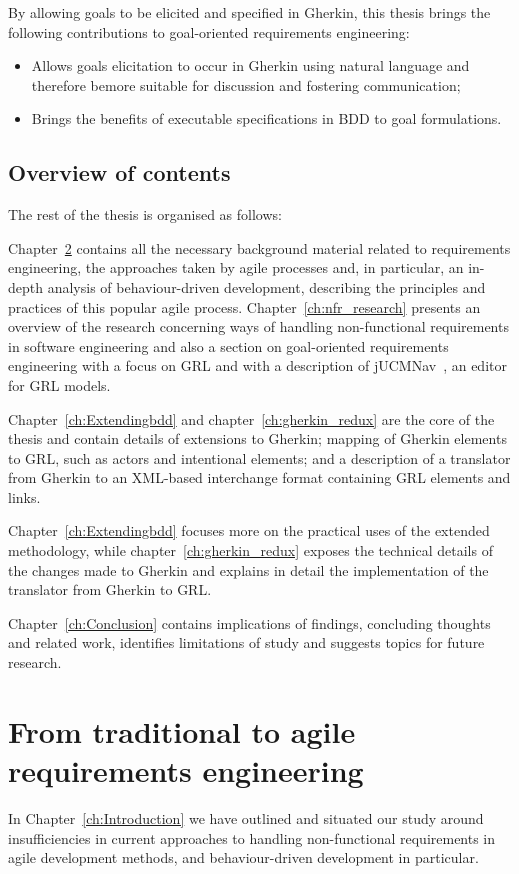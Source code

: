 \documentclass[dissertation,final]{softeng}
\begin{document}
{By allowing goals to be elicited and specified in Gherkin, this thesis brings the following contributions to goal-oriented requirements engineering:

\begin{center}
\begin{itemize}
\item Allows goals elicitation to occur in Gherkin using natural language and therefore bemore suitable for discussion and fostering communication;
\item Brings the benefits of executable specifications in BDD to goal formulations.
\end{itemize}
\end{center}


\section{Overview of contents}

The rest of the thesis is organised as follows:

Chapter~\ref{ch:Background} contains all the necessary background material related to requirements engineering, the approaches taken by agile processes and, in particular, an in-depth analysis of behaviour-driven development, describing the principles and practices of this popular agile process. Chapter~\ref{ch:nfr_research} presents an overview of the research concerning ways of handling non-functional requirements in software engineering and also a section on goal-oriented requirements engineering with a focus on GRL and with a description of jUCMNav~\citep{Amyot2010}, an editor for GRL models.

Chapter~\ref{ch:Extendingbdd} and chapter~\ref{ch:gherkin_redux} are the core of the thesis and contain details of extensions to Gherkin; mapping of Gherkin elements to GRL, such as actors and intentional elements; and a description of a translator from Gherkin to an XML-based interchange format containing GRL elements and links.

Chapter~\ref{ch:Extendingbdd} focuses more on the practical uses of the extended methodology, while chapter~\ref{ch:gherkin_redux} exposes the technical details of the changes made to Gherkin and explains in detail the implementation of the translator from Gherkin to GRL.

Chapter~\ref{ch:Conclusion} contains implications of findings, concluding thoughts and related work, identifies limitations of study and suggests topics for future research.
}
\chapter{From traditional to agile requirements engineering}
\label{ch:Background}
In Chapter~\ref{ch:Introduction} we have outlined and situated our study around insufficiencies in current approaches to handling non-functional requirements in agile development methods, and behaviour-driven development in particular. 
\end{document}
